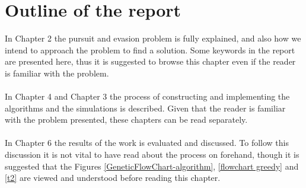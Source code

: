 \section{Outline of the report}
In Chapter 2 the pursuit and evasion problem is fully explained, and also how we intend to approach the problem to find a solution. Some keywords in the report are presented here, thus it is suggested to browse this chapter even if the reader is familiar with the problem.\\
\\In Chapter 4 and Chapter 3 the process of constructing and implementing the algorithms and the simulations is described. Given that the reader is familiar with the problem presented, these chapters can be read separately.\\
\\In Chapter 6 the results of the work is evaluated and discussed. To follow this discussion it is not vital to have read about the process on forehand, though it is suggested that the Figures \ref{GeneticFlowChart-algorithm}, \ref{flowchart greedy} and \ref{t2} are viewed and understood before reading this chapter.



